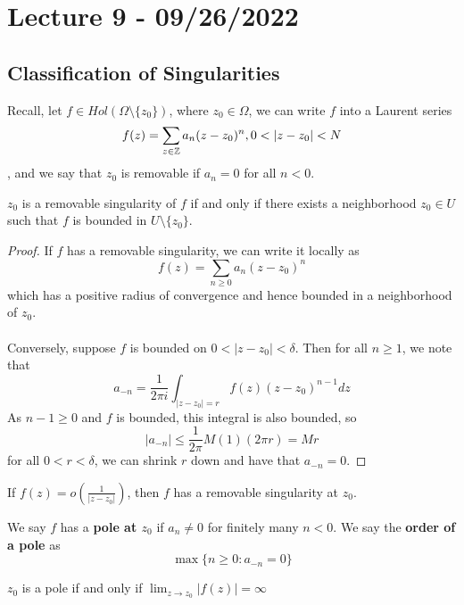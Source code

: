 \section{Lecture 9 - 09/26/2022}

\subsection{Classification of Singularities}

Recall, let $f \in Hol(\Omega \setminus \{z_0\})$, where $z_0 \in \Omega$, we can write $f$ into a Laurent series
\[f(z) = \sum_{z \in \mathbb{Z}} a_n (z - z_0)^n, 0 < |z - z_0| < N\]
, and we say that $z_0$ is removable if $a_n = 0$ for all $n < 0$.

\begin{theorem}
$z_0$ is a removable singularity of $f$ if and only if there exists a neighborhood $z_0 \in U$ such that $f$ is bounded in $U \setminus \{z_0\}$.
\end{theorem}

\begin{proof}
If $f$ has a removable singularity, we can write it locally as
\[f(z) = \sum_{n \geq 0} a_n (z - z_0)^n\]
which has a positive radius of convergence and hence bounded in a neighborhood of $z_0$.\\\\
Conversely, suppose $f$ is bounded on $0 < |z - z_0| < \delta$. Then for all $n \geq 1$, we note that
\[a_{-n} = \frac{1}{2\pi i} \int_{|z - z_0| = r} f(z) (z - z_0)^{n-1} dz \]
As $n-1 \geq 0$ and $f$ is bounded, this integral is also bounded, so
\[|a_{-n}| \leq \frac{1}{2\pi} M (1) (2\pi r) = Mr\]
for all $0 < r < \delta$, we can shrink $r$ down and have that $a_{-n} = 0$.
\end{proof}

\begin{remark}
If $f(z) = o(\frac{1}{|z - z_0|})$, then $f$ has a removable singularity at $z_0$.
\end{remark}

We say $f$ has a \textbf{pole at $z_0$} if $a_n \neq 0$ for finitely many $n < 0$. We say the \textbf{order of a pole} as
        \[\max \{n \geq 0: a_{-n} = 0\}\]
        
\begin{theorem}
$z_0$ is a pole if and only if $\lim_{z \to z_0} |f(z)| = \infty$
\end{theorem}

